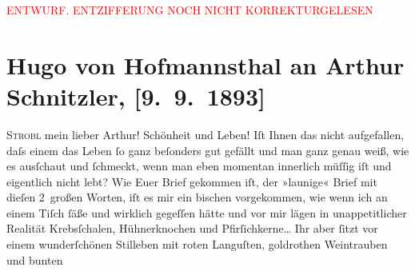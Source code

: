 
\begin{center}
            \textcolor{red}{ENTWURF. ENTZIFFERUNG NOCH NICHT KORREKTURGELESEN}
                      \end{center}
            
               \section[Hugo von Hofmannsthal an Arthur Schnitzler, {[}9. 9. 1893{]}]{ Hugo von Hofmannsthal an Arthur Schnitzler, {[}9. 9. 1893{]}}\nopagebreak{}\rehead{ }\begin{ledgroupsized}[t]{13cm}\normalsize\beginnumbering{} \toendnotes[C]{\smallbreak\pagebreak[2]} 
\toendnotes[C]{\smallbreak}\pstart
           \raggedleft{}{\pb}\textsc{Strobl}\pend
           \pstart{}mein lieber Arthur!\pend\pstart
           Schönheit und Leben! Iſt Ihnen das nicht aufgefallen, daſs einem das Leben ſo
                    ganz beſonders gut gefällt und man ganz genau weiß, wie es ausſchaut und
                    ſchmeckt, wenn man eben momentan innerlich müſſig iſt und eigentlich nicht lebt?
                    Wie Euer Brief gekommen
                    iſt, der »launige« Brief mit dieſen 2 großen Worten, iſt es mir ein bischen
                    vorgekommen, wie wenn ich an einem Tiſch ſäße und wirklich gegeſſen hätte und
                    vor mir lägen in unappetitlicher Realität {\pb}Krebsſchalen, Hühnerknochen
                    und Pfirſichkerne{\dots} Ihr aber ſitzt vor einem
                    wunderſchönen Stilleben mit roten Languſten, goldrothen Weintrauben und bunten

\end{ledgroupsized}

